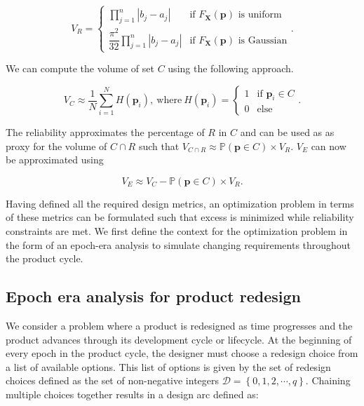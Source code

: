 \begin{equation} \label{eq:Rmontecarlo}
	V_R = {\begin{cases} \prod\limits_{j=1}^{n} \left|b_j - a_j\right| &{\text{if }}F_\mathbf{X}(\mathbf{p})\text{ is uniform}\\\dfrac{\pi^2}{32}\prod\limits_{j=1}^{n} \left|b_j - a_j\right| &{\text{if }}F_\mathbf{X}(\mathbf{p})\text{ is Gaussian}\end{cases}}.
\end{equation}

We can compute the volume of set $C$ using the following approach.

\begin{equation} \label{eq:Cmontecarlo}
	V_C \approx \dfrac{1}{N} {\sum\limits_{i=1}^{N} H\left(\mathbf{p}_i\right)}, ~\mathrm{where}~ H\left(\mathbf{p}_i\right)={\begin{cases}1&{\text{if }}\mathbf{p}_i\in C\\0&{\text{else}}\end{cases}}.
\end{equation}

The reliability approximates the percentage of $R$ in $C$ and can be used as as proxy for the volume of $C\cap R$ such that $V_{C\cap R} \approx \mathbb{P}(\mathbf{p} \in C) \times V_R$. $V_E$ can now be approximated using

\begin{equation} \label{eq:excesssimple}
	V_E \approx V_C - \mathbb{P}(\mathbf{p} \in C) \times V_R.
\end{equation}

Having defined all the required design metrics, an optimization problem in terms of these metrics can be formulated such that excess is minimized while reliability constraints are met. We first define the context for the optimization problem in the form of an epoch-era analysis to simulate changing requirements throughout the product cycle.

\subsection{Epoch era analysis for product redesign} \label{subsec:epochera}

We consider a problem where a product is redesigned as time progresses and the product advances through its development cycle or lifecycle. At the beginning of every epoch in the product cycle, the designer must choose a redesign choice from a list of available options. This list of options is given by the set of redesign choices defined as the set of non-negative integers $\mathcal{D} = \left\{0,1,2,\cdots,q\right\}$. Chaining multiple choices together results in a design arc defined as:


